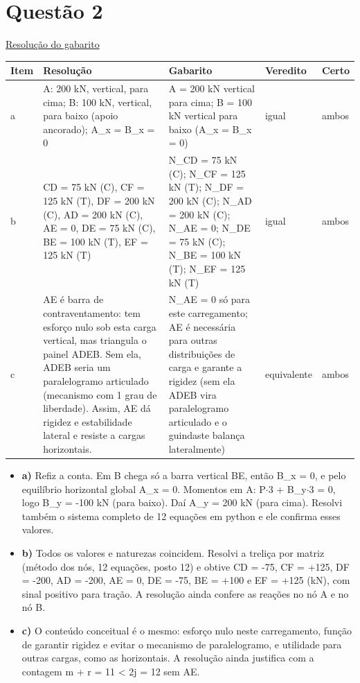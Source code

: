 \documentclass{article}%
\begin{document}
\section*{Questão 2}%
\href{https://poliedroresolve.sistemapoliedro.com.br/vestibulares/ime/2027/ime-2-fase-dia-2-27-10-2026-2-fase-dia-2/dissertativa-2-fisica-2-fase-dia-2-ime-2027}{Resolução do gabarito}\par\smallskip%
\begin{longtable}{@{}p{} p{} p{} p{} p{}@{}}\toprule Item & Resolução & Gabarito & Veredito & Certo \\ \midrule
a & A: 200 kN, vertical, para cima; B: 100 kN, vertical, para baixo (apoio ancorado); A\_x = B\_x = 0 & A = 200 kN vertical para cima; B = 100 kN vertical para baixo (A\_x = B\_x = 0) & igual & ambos \\
b & CD = 75 kN (C), CF = 125 kN (T), DF = 200 kN (C), AD = 200 kN (C), AE = 0, DE = 75 kN (C), BE = 100 kN (T), EF = 125 kN (T) & N\_CD = 75 kN (C); N\_CF = 125 kN (T); N\_DF = 200 kN (C); N\_AD = 200 kN (C); N\_AE = 0; N\_DE = 75 kN (C); N\_BE = 100 kN (T); N\_EF = 125 kN (T) & igual & ambos \\
c & AE é barra de contraventamento: tem esforço nulo sob esta carga vertical, mas triangula o painel ADEB. Sem ela, ADEB seria um paralelogramo articulado (mecanismo com 1 grau de liberdade). Assim, AE dá rigidez e estabilidade lateral e resiste a cargas horizontais. & N\_AE = 0 só para este carregamento; AE é necessária para outras distribuições de carga e garante a rigidez (sem ela ADEB vira paralelogramo articulado e o guindaste balança lateralmente) & equivalente & ambos \\
\bottomrule\end{longtable}%
\begin{itemize}%
\item%
\textbf{a)} Refiz a conta. Em B chega só a barra vertical BE, então B\_x = 0, e pelo equilíbrio horizontal global A\_x = 0. Momentos em A: P$\cdot$3 + B\_y$\cdot$3 = 0, logo B\_y = -100 kN (para baixo). Daí A\_y = 200 kN (para cima). Resolvi também o sistema completo de 12 equações em python e ele confirma esses valores.%
\item%
\textbf{b)} Todos os valores e naturezas coincidem. Resolvi a treliça por matriz (método dos nós, 12 equações, posto 12) e obtive CD = -75, CF = +125, DF = -200, AD = -200, AE = 0, DE = -75, BE = +100 e EF = +125 (kN), com sinal positivo para tração. A resolução ainda confere as reações no nó A e no nó B.%
\item%
\textbf{c)} O conteúdo conceitual é o mesmo: esforço nulo neste carregamento, função de garantir rigidez e evitar o mecanismo de paralelogramo, e utilidade para outras cargas, como as horizontais. A resolução ainda justifica com a contagem m + r = 11 < 2j = 12 sem AE.%
\end{itemize}%
\end{document}
